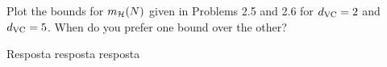 \begin{enunciado}{7}
    Plot the bounds for $m_{\mathcal{H}}(N)$ given in Problems 2.5 and 2.6 for $d_{\text{VC}} = 2$ and $d_{\text{VC}} = 5$. When do you prefer one bound over the other?
\end{enunciado}

Resposta resposta resposta
